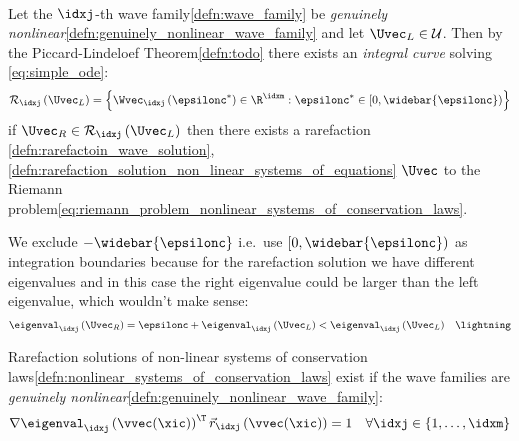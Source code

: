 \begin{lemmabox}\nospacing
    \begin{lemma}\label{lemma:existence_rarefactio_solution_non_linear_systems_of_equations}\leavevmode\\
        Let the $\idxj$-th wave family\cref{defn:wave_family} be \textit{genuinely nonlinear}\cref{defn:genuinely_nonlinear_wave_family}
        and let $\Uvec_{L}\in\admissibleset$.
        Then by the Piccard-Lindeloef Theorem\cref{defn:todo} there exists an \textit{integral curve} solving \cref{eq:simple_ode}:
        \begin{align}
          \mathcal{R}_{\idxj}\left(\Uvec_{L}\right)=\left\{\Wvec_{\idxj}\left(\epsilonc^{*}\right)\in\R^{\idxm}: \epsilonc^{*}\in[0,\widebar{\epsilonc})\right\}
        \end{align}
        if $\Uvec_{R}\in\mathcal{R}_{\idxj}\left(\Uvec_{L}\right)$ then there exists a rarefaction \cref{defn:rarefactoin_wave_solution},\cref{defn:rarefaction_solution_non_linear_systems_of_equations} $\Uvec$ to the Riemann problem\cref{eq:riemann_problem_nonlinear_systems_of_conservation_laws}.
    \end{lemma}
\end{lemmabox}
\begin{notebox}\nospacing
    We exclude $-\widebar{\epsilonc}$ i.e.\ use $[0,\widebar{\epsilonc})$ as integration boundaries because for the
    rarefaction solution we have different eigenvalues and in this case the right eigenvalue could be larger than the left eigenvalue, which wouldn't make sense:
    \begin{align*}
      \eigenval_{\idxj}\left(\Uvec_{R}\right)=\epsilonc+\eigenval_{\idxj}\left(\Uvec_{L}\right)<\eigenval_{\idxj}\left(\Uvec_{L}\right)&& \lightning
    \end{align*}
\end{notebox}
\begin{propositionbox}\nospacing
    \begin{proposition}
        \label{proposition:rarefaction_and_gnl_wave_families}
        Rarefaction solutions of non-linear systems of conservation laws\cref{defn:nonlinear_systems_of_conservation_laws} exist
        if the wave families are \textit{genuinely nonlinear}\cref{defn:genuinely_nonlinear_wave_family}:
        \begin{align}
          \nabla \eigenval_{\idxj}\left(\vvec(\xic)\right)^{\T}\vec{r}_{\idxj}\left(\vvec(\xic)\right)=1&&\forall\idxj\in \left\{1,\ldots,\idxm\right\}\label{eq:rarefaction_and_gnl_wave_families}
        \end{align}
    \end{proposition}
\end{propositionbox}
